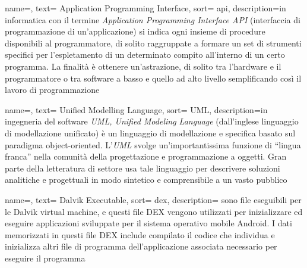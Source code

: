 \renewcommand{\acronymname}{Acronimi e abbreviazioni}

{
name=,
text= Application Programming Interface,
sort= api,
description={in informatica con il termine \emph{Application Programming Interface API} (interfaccia di programmazione di un'applicazione) si indica ogni insieme di procedure disponibili al programmatore, di solito raggruppate a formare un set di strumenti specifici per l'espletamento di un determinato compito all'interno di un certo programma.
La finalità è ottenere un'astrazione, di solito tra l'hardware e il programmatore o tra software a basso e quello ad alto livello semplificando così il lavoro di programmazione}
}

{
name=,
text= Unified Modelling Language,
sort= UML,
description={in ingegneria del software \emph{UML, Unified Modeling Language} (dall'inglese linguaggio di modellazione unificato) è un linguaggio di modellazione e specifica basato sul paradigma object-oriented.
L'\emph{UML} svolge un'importantissima funzione di ``lingua franca'' nella comunità della progettazione e programmazione a oggetti.
Gran parte della letteratura di settore usa tale linguaggio per descrivere soluzioni analitiche e progettuali in modo sintetico e comprensibile a un vasto pubblico}
}


{
name=,
text= Dalvik Executable,
sort= dex,
description={ sono file eseguibili per le Dalvik virtual machine, e questi file DEX vengono utilizzati per inizializzare ed eseguire applicazioni sviluppate per il sistema operativo mobile Android.
I dati memorizzati in questi file DEX include compilato il codice che individua e inizializza altri file di programma dell'applicazione associata necessario per eseguire il programma}
}


